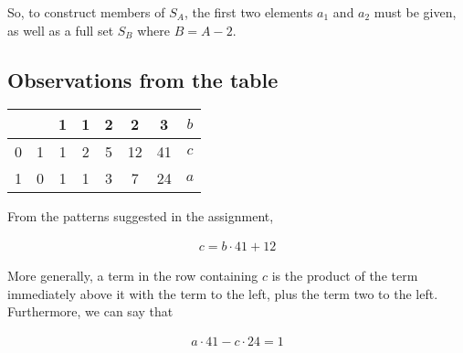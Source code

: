 \documentclass[12pt]{article}
\begin{document}
		So, to construct members of $S_A$, the first two elements $a_1$ and $a_2$ must be given, as well as a full set $S_B$ where $B = A-2$.

	\subsection{Observations from the table}

		\begin{table}[h!]
			\centering
			\begin{tabular}{c|c|c|c|c|c|c||c|}
				&   & 1 & 1 & 2 & 2  & 3 & $b$ \\
			\hline
			0 & 1 & 1 & 2 & 5 & 12 & 41 & $c$\\
			\hline
			1 & 0 & 1 & 1 & 3 & 7  & 24 & $a$\\
			\hline
			\end{tabular}
		\end{table}

		From the patterns suggested in the assignment,

		\begin{align*}
			c = b \cdot 41 + 12
		\end{align*}

		More generally, a term in the row containing $c$ is the product of the term immediately above it with the term to the left, plus the term two to the left.\\

		Furthermore, we can say that
		
		\begin{align*}
			a \cdot 41 - c \cdot 24 = 1
		\end{align*}
\end{document}
